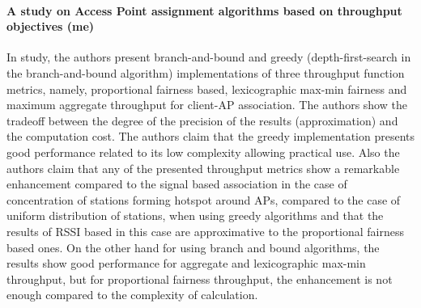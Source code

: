\documentclass[journal,transmag]{IEEEtran}
\begin{document}
\paragraph{A study on Access Point assignment algorithms based on throughput objectives (me)} In \cite{08AP_assignement_algorithms} study, the authors present branch-and-bound and greedy (depth-first-search in the branch-and-bound algorithm) implementations of three throughput function metrics, namely, proportional fairness based, lexicographic max-min fairness and maximum aggregate throughput for client-AP association. The authors show the tradeoff between the degree of the precision of the results (approximation) and the computation cost. The authors claim that the greedy implementation presents good performance related to its low complexity allowing practical use. Also the authors claim that any of the presented throughput metrics show a remarkable enhancement compared to the signal based association in the case of concentration of stations forming hotspot around APs, compared to the case of uniform distribution of stations, when using greedy algorithms and that the results of RSSI based in this case are approximative to the proportional fairness based ones. On the other hand for using branch and bound algorithms, the results show good performance for aggregate and lexicographic max-min throughput, but for proportional fairness throughput, the enhancement is not enough compared to the complexity of calculation. \\ 
\end{document}
